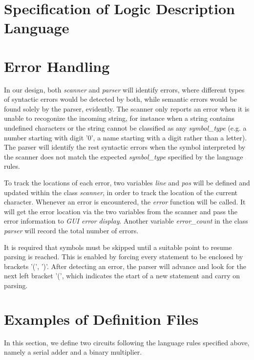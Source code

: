 \documentclass[12pt]{article}
\def\n{\noindent}
\begin{document}
\section{Specification of Logic Description Language}


\section{Error Handling}
In our design, both \textit{scanner} and \textit{parser} will identify errors, where different types of syntactic errors would be detected by both, while semantic errors would be found solely by the parser, evidently. The scanner only reports an error when it is unable to recogonize the incoming string, for instance when a string contains undefined characters or the string cannot be classified as any \emph{symbol\_type} (e.g. a number starting with digit '0', a name starting with a digit rather than a letter). The parser will identify the rest syntactic errors when the symbol interpreted by the scanner does not match the expected \emph{symbol\_type} specified by the language rules.

\n To track the locations of each error, two variables \textit{line} and \textit{pos} will be defined and updated within the class \textit{scanner}, in order to track the location of the current character. Whenever an error is encountered, the \textit{error} function will be called. It will get the error location via the two variables from the scanner and pass the error information to \textit{GUI error display}. Another variable \emph{error\_count} in the class \textit{parser} will record the total number of errors.

\n It is required that symbols must be skipped until a suitable point to resume parsing is reached. This is enabled by forcing every statement to be enclosed by brackets '(', ')'. After detecting an error, the parser will advance and look for the next left bracket '(', which indicates the start of a new statement and carry on parsing.



\section{Examples of Definition Files}
In this section, we define two circuits following the language rules specified above, namely a serial adder and a binary multiplier.
\end{document}
